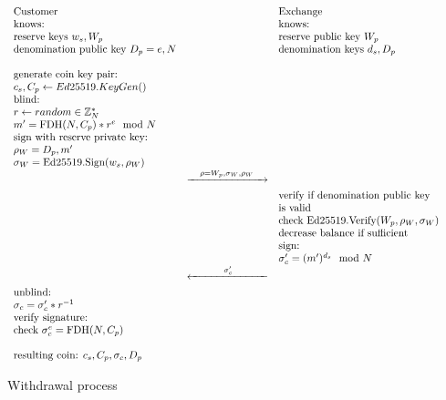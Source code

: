 \begin{figure}[htp]
    \begin{equation*}
        \resizebox{1.0\textwidth}{!}{$\displaystyle
        \begin{array}{ l c l }
            \text{Customer} &  & \text{Exchange}
            \\ \text{knows:} & & \text{knows:}
            \\ \text{reserve keys } w_s, W_p & & \text{reserve public key } W_p
            \\ \text{denomination public key } D_p = e, N & & \text{denomination keys } d_s, D_p
            \\ & &
            \\\text{generate coin key pair:} & &
            \\ c_s, C_p \leftarrow Ed25519.KeyGen() & &
            \\ \text{blind:} & &
            \\ r \leftarrow random \in \mathbb{Z}_N^* & &
            \\ m' = \text{FDH}(N, C_p)*r^{e} \mod N & &
            \\ \text{sign with reserve private key:} & &
            \\ \rho_W = D_p, m' & &
            \\ \sigma_W = \text{Ed25519.Sign}(w_s, \rho_W) & &
            \\ & \xrightarrow[\rule{2.5cm}{0pt}]{\rho = W_p, \sigma_W, \rho_W} &
            \\ & & \text{verify if denomination public key}
            \\ & & \text{is valid}
            \\ & & \text{check } \text{Ed25519.Verify}(W_p, \rho_W, \sigma_W)
            \\ & & \text{decrease balance if sufficient}
            \\ & & \text{sign:}
            \\ & & \sigma'_c = (m')^{d_s} \mod N
            \\ & \xleftarrow[\rule{2.5cm}{0pt}]{\sigma'_c} &
            \\ \text{unblind:}& &
            \\ \sigma_c = \sigma'_c*r^{-1} & &
            \\ \text{verify signature:}& &
            \\ \text{check } \sigma_c^{e} = \text{FDH}(N, C_p) & &
            \\ & &
            \\ \text{resulting coin: } c_s, C_p, \sigma_c, D_p & &
        \end{array}$
        }
    \end{equation*}
    \caption{Withdrawal process}
    \label{fig:withdrawal-process}
\end{figure}

